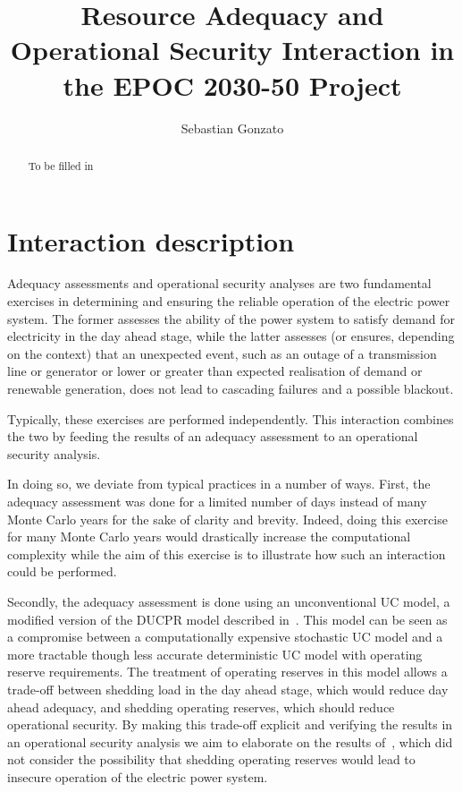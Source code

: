 \documentclass[number,times]{elsarticle}
\begin{document}
\title{Resource Adequacy and Operational Security Interaction in the EPOC 2030-50 Project}

\author{Sebastian Gonzato}

\maketitle

\begin{abstract}
    To be filled in
\end{abstract}

\newpage

\tableofcontents



\newpage

\section{Interaction description}

Adequacy assessments and operational security analyses are two fundamental exercises in determining and ensuring the reliable operation of the electric power system. The former assesses the ability of the power system to satisfy demand for electricity in the day ahead stage, while the latter assesses (or ensures, depending on the context) that an unexpected event, such as an outage of a transmission line or generator or lower or greater than expected realisation of demand or renewable generation, does not lead to cascading failures and a possible blackout.

Typically, these exercises are performed independently. This interaction combines the two by feeding the results of an adequacy assessment to an operational security analysis.

In doing so, we deviate from typical practices in a number of ways. First, the adequacy assessment was done for a limited number of days instead of many Monte Carlo years for the sake of clarity and brevity. Indeed, doing this exercise for many Monte Carlo years would drastically increase the computational complexity while the aim of this exercise is to illustrate how such an interaction could be performed.

Secondly, the adequacy assessment is done using an unconventional \ac{UC} model, a modified version of the \ac{DUCPR} model described in~\cite{Bruninx2017}. This model can be seen as a compromise between a computationally expensive stochastic \ac{UC} model and a more tractable though less accurate deterministic \ac{UC} model with operating reserve requirements. The treatment of operating reserves in this model allows a trade-off between shedding load in the day ahead stage, which would reduce day ahead adequacy, and shedding operating reserves, which should reduce operational security. By making this trade-off explicit and verifying the results in an operational security analysis we aim to elaborate on the results of~\cite{Hermans2018}, which did not consider the possibility that shedding operating reserves would lead to insecure operation of the electric power system.
\end{document}
